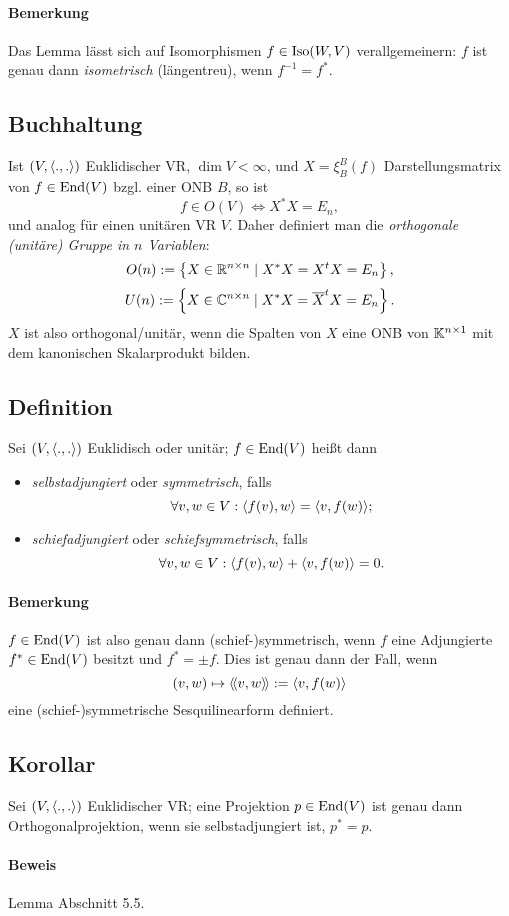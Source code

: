 \paragraph{Bemerkung}
	Das Lemma lässt sich auf Isomorphismen $ f\in \operatorname{Iso}(W,V) $ verallgemeinern:
	$ f $ ist genau dann \emph{isometrisch} (längentreu), wenn $ f^{-1} = f^* $.

\subsection{Buchhaltung}
	Ist $ (V,\langle .,. \rangle) $ Euklidischer VR, $ \dim V <\infty $,
	und $ X=\xi_B^B(f) $ Darstellungsmatrix von $ f\in \operatorname{End}(V) $ bzgl. einer ONB $ B $,
	so ist
		\[ f\in O(V)\Leftrightarrow X^*X = E_n, \]
	und analog für einen unitären VR $ V $.
	Daher definiert man die \emph{orthogonale (unitäre) Gruppe in $ n $ Variablen}:
		\[ O(n) := \left\{X\in \mathbb{R}^{n\times n}\mid X^*X = X^tX = E_n \right\}, \]
		\[ U(n) := \left\{X\in \mathbb{C}^{n\times n}\mid X^*X = \overline{X}^tX = E_n\right\}.\]
	$ X $ ist also orthogonal/unitär, wenn die Spalten von $ X $ eine ONB von $ \mathbb{K}^{n\times 1} $ mit dem kanonischen Skalarprodukt bilden.

\subsection{Definition}
	Sei $ (V,\langle .,. \rangle) $ Euklidisch oder unitär; $ f\in \operatorname{End}(V) $ heißt dann
		\begin{itemize}
			\item \emph{selbstadjungiert} oder \emph{symmetrisch}, falls
				\[ \forall v,w\in V: \langle f(v),w \rangle = \langle v,f(w) \rangle; \]
			\item \emph{schiefadjungiert} oder \emph{schiefsymmetrisch}, falls
				\[ \forall v,w\in V: \langle f(v),w \rangle + \langle v,f(w) \rangle = 0. \]
		\end{itemize}
\paragraph{Bemerkung}
	$ f\in \operatorname{End}(V) $ ist also genau dann (schief-)symmetrisch, wenn $ f $ eine Adjungierte $ f^* \in \operatorname{End}(V)$ besitzt und $ f^* = \pm f $. Dies ist genau dann der Fall, wenn
		\[ (v,w)\mapsto \langle\! \langle v,w \rangle\! \rangle := \langle v,f(w) \rangle \]
	eine (schief-)symmetrische Sesquilinearform definiert.

\subsection{Korollar}
	Sei $ (V,\langle .,. \rangle) $ Euklidischer VR; eine Projektion $ p\in \operatorname{End}(V) $ ist genau dann Orthogonalprojektion, wenn sie selbstadjungiert ist, $ p^* = p $.
\paragraph{Beweis}
	Lemma Abschnitt 5.5.